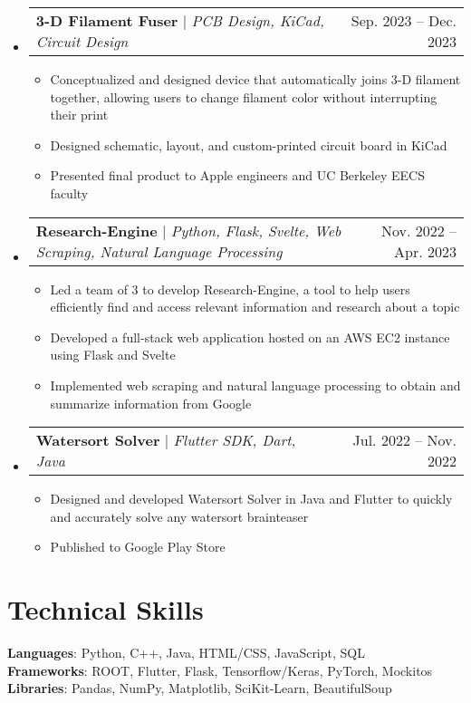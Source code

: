 \documentclass[letterpaper,11pt]{article}
\makeatletter
\newcommand{\resumeItem}[1]{
  \item\small{
    {#1 \vspace{-2pt}}
  }
}
\newcommand{\resumeProjectHeading}[2]{
    \item
    \begin{tabular*}{0.97\textwidth}{l@{\extracolsep{\fill}}r}
      \small#1 & #2 \\
    \end{tabular*}\vspace{-7pt}
}
\newcommand{\resumeSubHeadingListStart}{\begin{itemize}[leftmargin=0.15in, label={}]}
\newcommand{\resumeSubHeadingListEnd}{\end{itemize}}
\newcommand{\resumeItemListStart}{\begin{itemize}}
\newcommand{\resumeItemListEnd}{\end{itemize}\vspace{-5pt}}
\makeatother
\begin{document}
  \resumeSubHeadingListStart
    \resumeProjectHeading
      {\textbf{3-D Filament Fuser} $|$ \emph{PCB Design, KiCad, Circuit Design}}{Sep. 2023 -- Dec. 2023}
      \resumeItemListStart
        \resumeItem{Conceptualized and designed device that automatically joins 3-D filament together, allowing users to change filament color without interrupting their print}
        \resumeItem{Designed schematic, layout, and custom-printed circuit board in KiCad}
        \resumeItem{Presented final product to Apple engineers and UC Berkeley EECS faculty}
      \resumeItemListEnd
  \resumeSubHeadingListEnd

  \resumeSubHeadingListStart
    \resumeProjectHeading
      {\textbf{Research-Engine} $|$ \emph{Python, Flask, Svelte, Web Scraping, Natural Language Processing}}{Nov. 2022 -- Apr. 2023}
      \resumeItemListStart
        \resumeItem{Led a team of 3 to develop Research-Engine, a tool to help users efficiently find and access relevant information and research about a topic}
        \resumeItem{Developed a full-stack web application hosted on an AWS EC2 instance using Flask and Svelte}
        \resumeItem{Implemented web scraping and natural language processing to obtain and summarize information from Google}
      \resumeItemListEnd
  \resumeSubHeadingListEnd

  \resumeSubHeadingListStart
    \resumeProjectHeading
      {\textbf{Watersort Solver} $|$ \emph{Flutter SDK, Dart, Java}}{Jul. 2022 -- Nov. 2022}
      \resumeItemListStart
        \resumeItem{Designed and developed Watersort Solver in Java and Flutter to quickly and accurately solve any watersort brainteaser}
        \resumeItem{Published to Google Play Store}
      \resumeItemListEnd
  \resumeSubHeadingListEnd

\section{Technical Skills}
\begin{itemize}[leftmargin=0.15in, label={}] 
\small{\item{
  \textbf{Languages}: Python, C++, Java, HTML/CSS, JavaScript, SQL\\
  \textbf{Frameworks}: ROOT, Flutter, Flask, Tensorflow/Keras, PyTorch, Mockitos\\
  \textbf{Libraries}: Pandas, NumPy, Matplotlib, SciKit-Learn, BeautifulSoup
   }}
\end{itemize}
\end{document}
